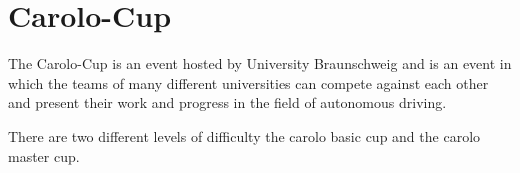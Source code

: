 \section{Carolo-Cup}
The Carolo-Cup is an event hosted by University Braunschweig and is an event in which the teams of many different universities can compete against each other and present their work and progress in the field of autonomous driving.

There are two different levels of difficulty the carolo basic cup and the carolo master cup\cite{carolocup}.













